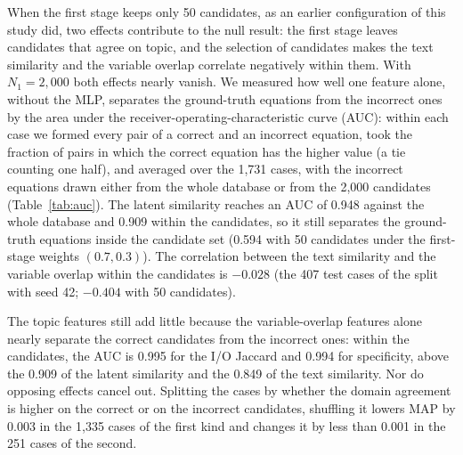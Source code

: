 When the first stage keeps only 50 candidates, as an earlier configuration of this study did, two
effects contribute to the null result: the first stage leaves candidates that agree on topic, and the
selection of candidates makes the text similarity and the variable overlap correlate negatively
within them. With $N_1 = 2{,}000$ both effects nearly vanish. We measured how well one feature alone, without the
MLP, separates the ground-truth equations from the incorrect ones by the area under the
receiver-operating-characteristic curve (AUC): within each case we formed every pair of a correct
and an incorrect equation, took the fraction of pairs in which the correct equation has the higher
value (a tie counting one half), and averaged over the 1,731 cases, with the incorrect equations
drawn either from the whole database or from the 2,000 candidates (Table~\ref{tab:auc}). The latent
similarity reaches an AUC of 0.948 against the whole database and 0.909 within the candidates, so
it still separates the ground-truth equations inside the candidate set (0.594 with 50 candidates
under the first-stage weights $(0.7, 0.3)$). The correlation between the text similarity and the
variable overlap within the candidates is $-0.028$ (the 407 test cases of the split with seed 42;
$-0.404$ with 50 candidates).

The topic features still add little because the variable-overlap features alone nearly separate
the correct candidates from the incorrect ones: within the candidates, the AUC is 0.995 for the
I/O Jaccard and 0.994 for specificity, above the 0.909 of the latent similarity and the 0.849 of
the text similarity. Nor do opposing effects cancel out. Splitting the cases by whether the domain
agreement is higher on the correct or on the incorrect candidates, shuffling it lowers MAP by
0.003 in the 1,335 cases of the first kind and changes it by less than 0.001 in the 251 cases of
the second.


